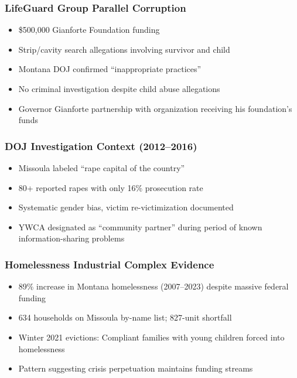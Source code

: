 \documentclass[11pt,letterpaper]{article}
\begin{document}
\subsubsection{LifeGuard Group Parallel Corruption}
\begin{itemize}[leftmargin=*]
\item \$500,000 Gianforte Foundation funding
\item Strip/cavity search allegations involving survivor and child
\item Montana DOJ confirmed ``inappropriate practices''
\item No criminal investigation despite child abuse allegations
\item Governor Gianforte partnership with organization receiving his foundation's funds
\end{itemize}

\subsubsection{DOJ Investigation Context (2012--2016)}
\begin{itemize}[leftmargin=*]
\item Missoula labeled ``rape capital of the country''
\item 80+ reported rapes with only 16\% prosecution rate
\item Systematic gender bias, victim re-victimization documented
\item YWCA designated as ``community partner'' during period of known information-sharing problems
\end{itemize}

\subsubsection{Homelessness Industrial Complex Evidence}
\begin{itemize}[leftmargin=*]
\item 89\% increase in Montana homelessness (2007--2023) despite massive federal funding
\item 634 households on Missoula by-name list; 827-unit shortfall
\item Winter 2021 evictions: Compliant families with young children forced into homelessness
\item Pattern suggesting crisis perpetuation maintains funding streams
\end{itemize}

\newpage
\end{document}
